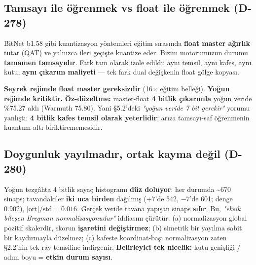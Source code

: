 \documentclass[11pt]{article}
\newenvironment{notkutu}{\def\FrameCommand{\fboxsep=6pt\colorbox{kutu}}\MakeFramed{\advance\hsize-\width\FrameRestore}\small}{\endMakeFramed}
\begin{document}
\subsection*{Tamsayı ile öğrenmek vs float ile öğrenmek (D-278)}
BitNet b1.58 gibi kuantizasyon yöntemleri eğitim sırasında \textbf{float master ağırlık} tutar (QAT) ve yalnızca ileri geçişte kuantize eder. Bizim motorumuzun durumu \textbf{tamamen tamsayıdır}. Fark tam olarak izole edildi: aynı temsil, aynı kafes, aynı kutu, \textbf{aynı çıkarım maliyeti} — tek fark dual değişkenin float gölge kopyası.
\begin{center}\small{}\end{center}
\textbf{Seyrek rejimde float master gereksizdir} (16× eğitim belleği). \textbf{Yoğun rejimde kritiktir.}
\begin{notkutu}\textbf{Öz-düzeltme:} master-float \textbf{4 bitlik çıkarımla} yoğun veride \%75.27 aldı (Warmuth 75.80). Yani §5.2'deki \emph{"yoğun veride 7 bit gerekir"} yorumu yanlıştı: \textbf{4 bitlik kafes temsil olarak yeterlidir}; arıza tamsayı-saf öğrenmenin kuantum-altı biriktirememesidir.
\end{notkutu}
\subsection*{Doygunluk yayılmadır, ortak kayma değil (D-280)}
Yoğun tezgâhta 4 bitlik sayaç histogramı \textbf{düz doluyor}: her durumda \textasciitilde{}670 sinaps; tavandakiler \textbf{iki uca birden} dağılmış (+7'de 542, −7'de 601; denge 0.902), $\lvert\text{ort}\rvert/\text{std}=0.016$. Gerçek veride tavana yapışan sinaps \textbf{sıfır}.
\begin{notkutu}Bu, \emph{"eksik bileşen Bregman normalizasyonudur"} iddiasını çürütür: (a) normalizasyon global pozitif skalerdir, skorun \textbf{işaretini değiştirmez}; (b) simetrik bir yayılma sabit bir kaydırmayla düzelmez; (c) kafeste koordinat-başı normalizasyon zaten §2.2'nin tek-ray temsiline indirgenir.
\end{notkutu}
\textbf{Belirleyici tek nicelik:} kutu genişliği / adım boyu = \textbf{etkin durum sayısı}.
\end{document}
